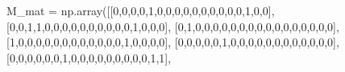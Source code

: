 \documentclass[
  letterpaper,
  DIV=11,
  numbers=noendperiod]{scrreprt}
\newenvironment{Shaded}{\begin{snugshade}}{\end{snugshade}}
\newcommand{\DecValTok}[1]{\textcolor[rgb]{0.68,0.00,0.00}{#1}}
\newcommand{\NormalTok}[1]{\textcolor[rgb]{0.00,0.23,0.31}{#1}}
\newcommand{\OperatorTok}[1]{\textcolor[rgb]{0.37,0.37,0.37}{#1}}
\begin{document}
\begin{tcolorbox}
\begin{Shaded}
\begin{Highlighting}[]
\NormalTok{M\_mat }\OperatorTok{=}\NormalTok{ np.array([[}\DecValTok{0}\NormalTok{,}\DecValTok{0}\NormalTok{,}\DecValTok{0}\NormalTok{,}\DecValTok{0}\NormalTok{,}\DecValTok{1}\NormalTok{,}\DecValTok{0}\NormalTok{,}\DecValTok{0}\NormalTok{,}\DecValTok{0}\NormalTok{,}\DecValTok{0}\NormalTok{,}\DecValTok{0}\NormalTok{,}\DecValTok{0}\NormalTok{,}\DecValTok{0}\NormalTok{,}\DecValTok{0}\NormalTok{,}\DecValTok{0}\NormalTok{,}\DecValTok{0}\NormalTok{,}\DecValTok{1}\NormalTok{,}\DecValTok{0}\NormalTok{,}\DecValTok{0}\NormalTok{],}
\NormalTok{               [}\DecValTok{0}\NormalTok{,}\DecValTok{0}\NormalTok{,}\DecValTok{1}\NormalTok{,}\DecValTok{1}\NormalTok{,}\DecValTok{0}\NormalTok{,}\DecValTok{0}\NormalTok{,}\DecValTok{0}\NormalTok{,}\DecValTok{0}\NormalTok{,}\DecValTok{0}\NormalTok{,}\DecValTok{0}\NormalTok{,}\DecValTok{0}\NormalTok{,}\DecValTok{0}\NormalTok{,}\DecValTok{0}\NormalTok{,}\DecValTok{0}\NormalTok{,}\DecValTok{1}\NormalTok{,}\DecValTok{0}\NormalTok{,}\DecValTok{0}\NormalTok{,}\DecValTok{0}\NormalTok{],}
\NormalTok{               [}\DecValTok{0}\NormalTok{,}\DecValTok{1}\NormalTok{,}\DecValTok{0}\NormalTok{,}\DecValTok{0}\NormalTok{,}\DecValTok{0}\NormalTok{,}\DecValTok{0}\NormalTok{,}\DecValTok{0}\NormalTok{,}\DecValTok{0}\NormalTok{,}\DecValTok{0}\NormalTok{,}\DecValTok{0}\NormalTok{,}\DecValTok{0}\NormalTok{,}\DecValTok{0}\NormalTok{,}\DecValTok{0}\NormalTok{,}\DecValTok{0}\NormalTok{,}\DecValTok{0}\NormalTok{,}\DecValTok{0}\NormalTok{,}\DecValTok{0}\NormalTok{,}\DecValTok{0}\NormalTok{],}
\NormalTok{               [}\DecValTok{1}\NormalTok{,}\DecValTok{0}\NormalTok{,}\DecValTok{0}\NormalTok{,}\DecValTok{0}\NormalTok{,}\DecValTok{0}\NormalTok{,}\DecValTok{0}\NormalTok{,}\DecValTok{0}\NormalTok{,}\DecValTok{0}\NormalTok{,}\DecValTok{0}\NormalTok{,}\DecValTok{0}\NormalTok{,}\DecValTok{0}\NormalTok{,}\DecValTok{0}\NormalTok{,}\DecValTok{0}\NormalTok{,}\DecValTok{1}\NormalTok{,}\DecValTok{0}\NormalTok{,}\DecValTok{0}\NormalTok{,}\DecValTok{0}\NormalTok{,}\DecValTok{0}\NormalTok{],}
\NormalTok{               [}\DecValTok{0}\NormalTok{,}\DecValTok{0}\NormalTok{,}\DecValTok{0}\NormalTok{,}\DecValTok{0}\NormalTok{,}\DecValTok{0}\NormalTok{,}\DecValTok{1}\NormalTok{,}\DecValTok{0}\NormalTok{,}\DecValTok{0}\NormalTok{,}\DecValTok{0}\NormalTok{,}\DecValTok{0}\NormalTok{,}\DecValTok{0}\NormalTok{,}\DecValTok{0}\NormalTok{,}\DecValTok{0}\NormalTok{,}\DecValTok{0}\NormalTok{,}\DecValTok{0}\NormalTok{,}\DecValTok{0}\NormalTok{,}\DecValTok{0}\NormalTok{,}\DecValTok{0}\NormalTok{],}
\NormalTok{               [}\DecValTok{0}\NormalTok{,}\DecValTok{0}\NormalTok{,}\DecValTok{0}\NormalTok{,}\DecValTok{0}\NormalTok{,}\DecValTok{0}\NormalTok{,}\DecValTok{0}\NormalTok{,}\DecValTok{1}\NormalTok{,}\DecValTok{0}\NormalTok{,}\DecValTok{0}\NormalTok{,}\DecValTok{0}\NormalTok{,}\DecValTok{0}\NormalTok{,}\DecValTok{0}\NormalTok{,}\DecValTok{0}\NormalTok{,}\DecValTok{0}\NormalTok{,}\DecValTok{0}\NormalTok{,}\DecValTok{0}\NormalTok{,}\DecValTok{1}\NormalTok{,}\DecValTok{1}\NormalTok{],}

\end{Highlighting}
\end{Shaded}
\end{tcolorbox}
\end{document}
